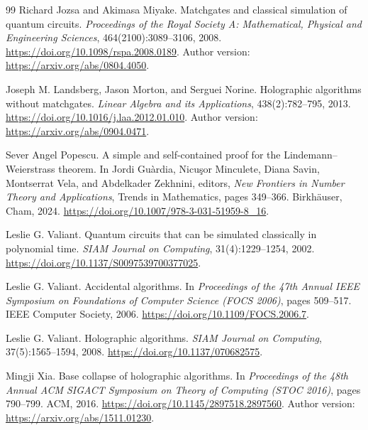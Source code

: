 \documentclass[11pt]{article}
\theoremstyle{definition}
\theoremstyle{remark}
\begin{document}
\begin{thebibliography}{99}
Richard Jozsa and Akimasa Miyake.
\newblock Matchgates and classical simulation of quantum circuits.
\newblock \emph{Proceedings of the Royal Society A: Mathematical, Physical
and Engineering Sciences}, 464(2100):3089--3106, 2008.
\newblock \url{https://doi.org/10.1098/rspa.2008.0189}.
\newblock Author version: \url{https://arxiv.org/abs/0804.4050}.

Joseph M. Landsberg, Jason Morton, and Serguei Norine.
\newblock Holographic algorithms without matchgates.
\newblock \emph{Linear Algebra and its Applications}, 438(2):782--795,
2013.
\newblock \url{https://doi.org/10.1016/j.laa.2012.01.010}.
\newblock Author version: \url{https://arxiv.org/abs/0904.0471}.

Sever Angel Popescu.
\newblock A simple and self-contained proof for the
Lindemann--Weierstrass theorem.
\newblock In Jordi Gu\`ardia, Nicu\c{s}or Minculete, Diana Savin, Montserrat
Vela, and Abdelkader Zekhnini, editors, \emph{New Frontiers in Number Theory
and Applications}, Trends in Mathematics, pages 349--366. Birkh\"auser,
Cham, 2024.
\newblock \url{https://doi.org/10.1007/978-3-031-51959-8_16}.

Leslie G. Valiant.
\newblock Quantum circuits that can be simulated classically in polynomial
time.
\newblock \emph{SIAM Journal on Computing}, 31(4):1229--1254, 2002.
\newblock \url{https://doi.org/10.1137/S0097539700377025}.

Leslie G. Valiant.
\newblock Accidental algorithms.
\newblock In \emph{Proceedings of the 47th Annual IEEE Symposium on
Foundations of Computer Science (FOCS 2006)}, pages 509--517. IEEE Computer
Society, 2006.
\newblock \url{https://doi.org/10.1109/FOCS.2006.7}.

Leslie G. Valiant.
\newblock Holographic algorithms.
\newblock \emph{SIAM Journal on Computing}, 37(5):1565--1594, 2008.
\newblock \url{https://doi.org/10.1137/070682575}.

Mingji Xia.
\newblock Base collapse of holographic algorithms.
\newblock In \emph{Proceedings of the 48th Annual ACM SIGACT Symposium on
Theory of Computing (STOC 2016)}, pages 790--799. ACM, 2016.
\newblock \url{https://doi.org/10.1145/2897518.2897560}.
\newblock Author version: \url{https://arxiv.org/abs/1511.01230}.

\end{thebibliography}
\end{document}
